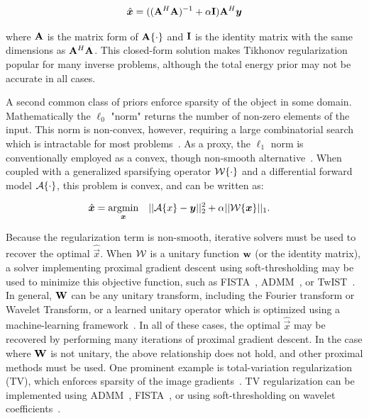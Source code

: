 \begin{equation}
    \hat{\bm{x}} = ((\mathbf{A}^H \mathbf{A})^{-1} + \alpha \mathbf{I})\mathbf{A}^H \bm{y}
\end{equation}

\noindent where $\mathbf{A}$ is the matrix form of $\mathbf{A}\{\cdot\}$ and $\mathbf{I}$ is the identity matrix with the same dimensions as $\mathbf{A}^H \mathbf{A}$. This closed-form solution makes Tikhonov regularization popular for many inverse problems, although the total energy prior may not be accurate in all cases.

A second common class of priors enforce sparsity of the object in some domain. Mathematically the $\ell_0$ "norm" returns the number of non-zero elements of the input. This norm is non-convex, however, requiring a large combinatorial search which is intractable for most problems~\cite{candes2008enhancing}. As a proxy, the $\ell_1$ norm is conventionally employed as a convex, though non-smooth alternative~\cite{taylor1979deconvolution}. When coupled with a generalized sparsifying operator $\mathcal{W}\{\cdot\}$ and a differential forward model $\mathcal{A}\{\cdot\}$, this problem is convex, and can be written as:

\begin{equation}\label{eq:intro_sparse}
\begin{aligned}
& \hat{\bm{x}} = \underset{\bm{x}}{\text{argmin}}
& & ||\mathcal{A}\{x\}-\bm{y} ||_2^2 + \alpha||\mathcal{W}\{\bm{x}\}||_1.
\end{aligned}
\end{equation}

Because the regularization term is non-smooth, iterative solvers must be used to recover the optimal $\hat{\vec{x}}$. When $\mathcal{W}$ is a unitary function $\mathbf{w}$ (or the identity matrix), a solver implementing proximal gradient descent using soft-thresholding may be used to minimize this objective function, such as FISTA~\cite{beck2009fast}, ADMM~\cite{boyd2011distributed}, or TwIST~\cite{bioucas2007new}. In general, $\mathbf{W}$ can be any unitary transform, including the Fourier transform  or Wavelet Transform, or a learned unitary operator which is optimized using a machine-learning framework~\cite{ravishankar2013learning}. In all of these cases, the optimal $\hat{\vec{x}}$ may be recovered by performing many iterations of proximal gradient descent. In the case where $\mathbf{W}$ is not unitary, the above relationship does not hold, and other proximal methods must be used. One prominent example is total-variation regularization (TV), which enforces sparsity of the image gradients~\cite{rudin1992nonlinear}. TV regularization can be implemented using ADMM~\cite{wahlberg2012admm}, FISTA~\cite{beck2009fast}, or using soft-thresholding on wavelet coefficients~\cite{kamilov2012wavelet}.

